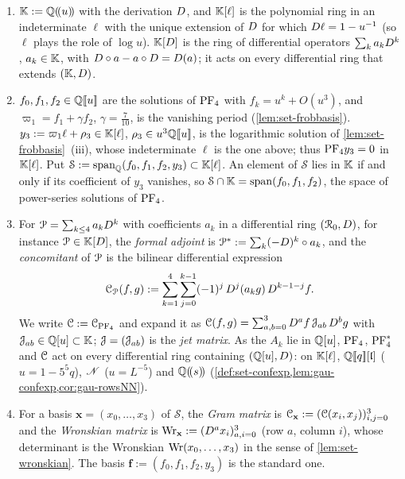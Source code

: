 \begin{defn}
\label{def:gau-conc}
\begin{enumerate}
\item $\mathbb{K}:=\mathbb{Q}(\!(u)\!)$ with the derivation $D$, and $\mathbb{K}[\ell]$ is the polynomial ring in an indeterminate $\ell$ with the unique extension of $D$ for which $D\ell=1-u^{-1}$ (so $\ell$ plays the role of $\log u$). $\mathbb{K}[D]$ is the ring of differential operators $\sum_ka_kD^k$, $a_k\in\mathbb{K}$, with $D\circ a-a\circ D=D(a)$; it acts on every differential ring that extends $(\mathbb{K},D)$.
\item $f_0,f_1,f_2\in\mathbb{Q}[\![ u ]\!]$ are the solutions of $\mathrm{PF}_{4}$ with $f_k=u^k+O(u^3)$, and $\varpi_1=f_1+\gamma f_2$, $\gamma=\frac7{10}$, is the vanishing period (\cref{lem:set-frobbasis}). $y_3:=\varpi_1\ell+\rho_3\in\mathbb{K}[\ell]$, $\rho_3\in u^3\mathbb{Q}[\![ u ]\!]$, is the logarithmic solution of \cref{lem:set-frobbasis}~(iii), whose indeterminate $\ell$ is the one above; thus $\mathrm{PF}_{4} y_3=0$ in $\mathbb{K}[\ell]$. Put $\mathcal S:=\operatorname{span}_{\mathbb{Q}}(f_0,f_1,f_2,y_3)\subset\mathbb{K}[\ell]$. An element of $\mathcal S$ lies in $\mathbb{K}$ if and only if its coefficient of $y_3$ vanishes, so $\mathcal S\cap\mathbb{K}=\operatorname{span}(f_0,f_1,f_2)$, the space of power-series solutions of $\mathrm{PF}_{4}$.
\item For $\mathcal{P}=\sum_{k\leq4}a_kD^k$ with coefficients $a_k$ in a differential ring $(\mathcal{R}_0,D)$, for instance $\mathcal{P}\in\mathbb{K}[D]$, the \emph{formal adjoint} is $\mathcal{P}^*:=\sum_k(-D)^k\circ a_k$, and the \emph{concomitant} of $\mathcal{P}$ is the bilinear differential expression
\[
\mathcal{C}_{\mathcal{P}}(f,g):=\sum_{k=1}^4\sum_{j=0}^{k-1}(-1)^j\,D^j(a_kg)\,D^{k-1-j}f .
\]
We write $\mathcal{C}:=\mathcal{C}_{\mathrm{PF}_{4}}$ and expand it as $\mathcal{C}(f,g)=\sum_{a,b=0}^3D^af\,\mathcal{J}_{ab}\,D^bg$ with $\mathcal{J}_{ab}\in\mathbb{Q}[u]\subset\mathbb{K}$; $\mathcal{J}=(\mathcal{J}_{ab})$ is the \emph{jet matrix}. As the $A_k$ lie in $\mathbb{Q}[u]$, $\mathrm{PF}_{4}$, $\mathrm{PF}_{4}^*$ and $\mathcal{C}$ act on every differential ring containing $(\mathbb{Q}[u],D)$: on $\mathbb{K}[\ell]$, $\mathbb{Q}[\![ q ]\!][\mathfrak{l}]$ ($u=1-5^5q$), $\mathscr{N}$ ($u=L^{-5}$) and $\mathbb{Q}(\!(s)\!)$ (\cref{def:set-confexp,lem:gau-confexp,cor:gau-rowsNN}).
\item For a basis $\mathbf x=(x_0,\dots,x_3)$ of $\mathcal S$, the \emph{Gram matrix} is $\mathcal{C}_{\mathbf x}:=(\mathcal{C}(x_i,x_j))_{i,j=0}^3$ and the \emph{Wronskian matrix} is $\operatorname{Wr}_{\mathbf x}:=(D^ax_i)_{a,i=0}^3$ (row $a$, column $i$), whose determinant is the Wronskian $\operatorname{Wr}(x_0,\dots,x_3)$ in the sense of \cref{lem:set-wronskian}. The basis $\mathbf f:=(f_0,f_1,f_2,y_3)$ is the standard one.

\end{enumerate}
\end{defn}
